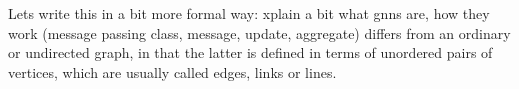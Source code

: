 Lets write this in a bit more formal way: 
xplain a bit what gnns are, how they work (message passing class, message, update, aggregate)
differs from an ordinary or undirected graph, in that the latter is defined in terms of unordered pairs of vertices, which are usually called edges, links or lines. 